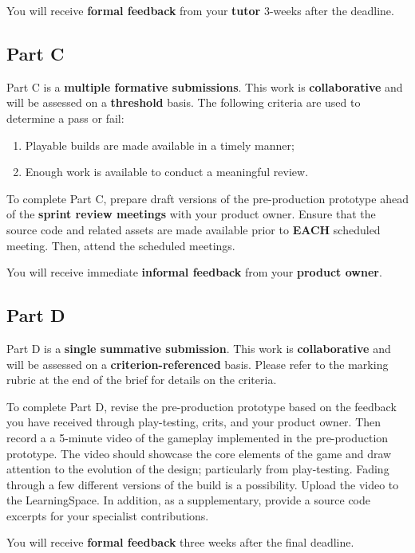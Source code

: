 \documentclass{../../fal_assignment}
\begin{document}
You will receive \textbf{formal feedback} from your \textbf{tutor} 3-weeks after the deadline.

\subsection*{Part C}

Part C is a \textbf{multiple formative submissions}. This work is \textbf{collaborative} and will be assessed on a \textbf{threshold} basis. The following criteria are used to determine a pass or fail:

\begin{enumerate}[label=(\alph*)]
	\item Playable builds are made available in a timely manner;
	\item Enough work is available to conduct a meaningful review.
\end{enumerate}

To complete Part C, prepare draft versions of the pre-production prototype ahead of the \textbf{sprint review meetings} with your product owner. Ensure that the source code and related assets are made available prior to \textbf{EACH} scheduled meeting. Then, attend the scheduled meetings.

You will receive immediate \textbf{informal feedback} from your \textbf{product owner}.

\subsection*{Part D}

Part D is a \textbf{single summative submission}. This work is \textbf{collaborative} and will be assessed on a \textbf{criterion-referenced} basis. Please refer to the marking rubric at the end of the brief for details on the criteria.

To complete Part D, revise the pre-production prototype based on the feedback you have received through play-testing, crits, and your product owner. Then record a a 5-minute video of the gameplay implemented in the pre-production prototype. The video should showcase the core elements of the game and draw attention to the evolution of the design; particularly from play-testing. Fading through a few different versions of the build is a possibility. Upload the video to the LearningSpace. In addition, as a supplementary, provide a source code excerpts for your specialist contributions.

You will receive \textbf{formal feedback} three weeks after the final deadline.
\end{document}
